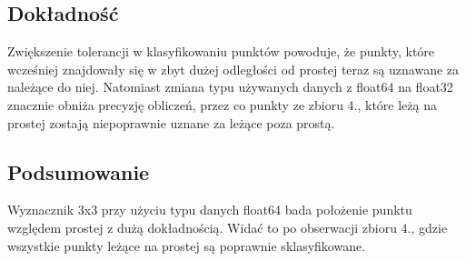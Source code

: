 \documentclass[11pt]{scrartcl}
\begin{document}
    \subsection*{Dokładność}
    Zwiększenie tolerancji w klasyfikowaniu punktów powoduje, że punkty,
    które wcześniej znajdowały się w zbyt dużej odległości od prostej
    teraz są uznawane za należące do niej. Natomiast zmiana typu używanych
    danych z float64 na float32 znacznie obniża precyzję obliczeń, przez co
    punkty ze zbioru 4., które leżą na prostej zostają niepoprawnie uznane
    za leżące poza prostą.
    \subsection*{Podsumowanie}
    Wyznacznik 3x3 przy użyciu typu danych float64 bada położenie punktu
    względem prostej z dużą dokładnością. Widać to po obserwacji zbioru 4.,
    gdzie wszystkie punkty leżące na prostej są poprawnie sklasyfikowane.
\end{document}
